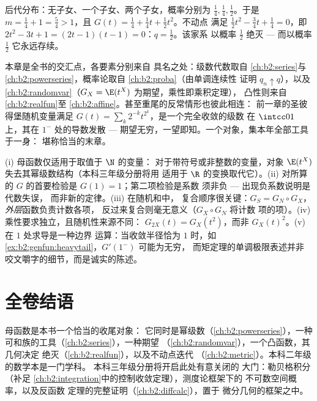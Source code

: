 \begin{example}\label{ex:b2:genfun:branchingexample}
后代分布：无子女、一个子女、两个子女，概率分别为
$\frac14, \frac14, \frac12$。于是 $m = \frac14 + 1 =
\frac54 > 1$，且 $G(t) = \frac14 + \frac14 t + \frac12 t^2$。不动点
满足 $\frac12 t^2 - \frac34 t + \frac14 = 0$，即\ $2t^2 - 3t
+ 1 = (2t - 1)(t - 1) = 0$：$q = \frac12$。该家系
以概率 $\frac12$ 绝灭 --- 而以概率 $\frac12$
它永远存续。
\end{example}

\begin{remark}[本卷中的视角]
本章是全书的交汇点，各要素分别来自
具名之处：级数代数取自
\cref{ch:b2:series}与\cref{ch:b2:powerseries}，概率论取自
\cref{ch:b2:proba}（由单调连续性
证明 $q_n \uparrow q$），以及\cref{ch:b2:randomvar}（$G_X =
\E(t^X)$ 为期望，乘性即乘积定理），
凸性则来自\cref{ch:b2:realfun}至
\cref{ch:b2:affine}。甚至重尾的反常情形也彼此相连：
前一章的圣彼得堡随机变量满足
$G(t) = \sum_k2^{-k}t^{2^k}$，是一个完全收敛的级数
在 $\intcc01$ 上，其在 $1^-$ 处的导数发散 ---
期望无穷，一望即知。一个对象，集本年全部工具于一身：
堪称恰当的末章。
\end{remark}

\begin{remark}[常见误区]
(i) 母函数仅适用于取值于 $\N$ 的变量：
对于带符号或非整数的变量，对象 $\E(t^X)$
失去其幂级数结构（本科三年级分册将用
适用于 $\R$ 的变换取代它）。(ii) 对所算的 $G$ 的首要检验是
$G(1) = 1$；第二项检验是系数
须非负 --- 出现负系数说明是代数失误，
而非新的定律。(iii) 在随机和中，
复合顺序很关键：$G_S = G_N \circ G_X$，
\emph{外层}函数负责计数各项，
反过来复合则毫无意义（$G_X \circ G_N$ 将计数
项的项）。(iv) 乘性要求独立，且随机性来源不同：
$G_{2X}(t) = G_X(t^2)$，而非
$G_X(t)^2$。(v) 在 $1$ 处求导是一种边界
运算：当收敛半径恰为 $1$ 时，如
\cref{ex:b2:genfun:heavytail}，$G'(1^-)$ 可能为无穷，
而矩定理的单调极限表述并非
咬文嚼字的细节，而是诚实的陈述。
\end{remark}

\section*{全卷结语}

母函数是本书一个恰当的收尾对象：
它同时是幂级数（\cref{ch:b2:powerseries}），一种
可和族的工具（\cref{ch:b2:series}），一种期望
（\cref{ch:b2:randomvar}），一个凸函数，其几何决定
绝灭（\cref{ch:b2:realfun}），以及不动点迭代
（\cref{ch:b2:metric}）。本科二年级的数学本是一门学科。
本科三年级分册将开启此处有意关闭的
大门：勒贝格积分（补足
\cref{ch:b2:integration}中的控制收敛定理），测度论框架下的
不可数空间概率，以及反函数
定理的完整证明（\cref{ch:b2:diffcalc}），置于
微分几何的框架之中。

